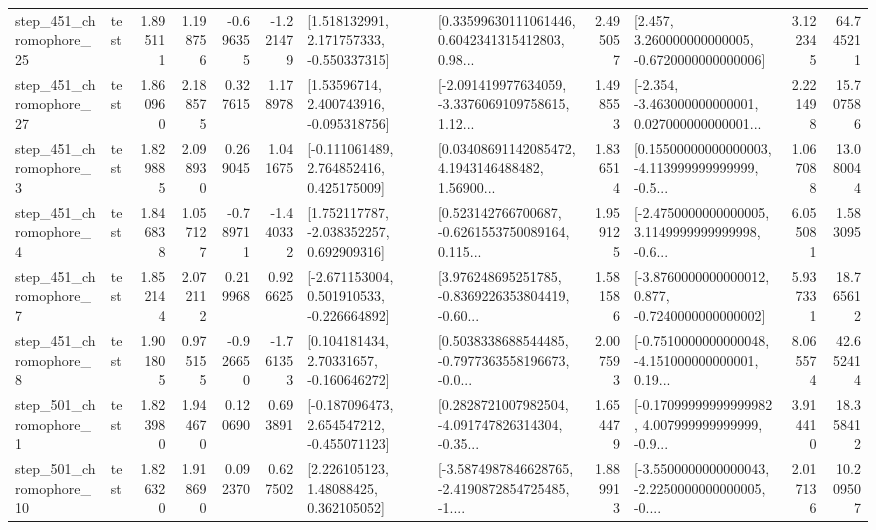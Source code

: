 \begin{tabular}{llrrrrllrlrr}
  step\_451\_chromophore\_25 &      test &      1.895111 &    1.198756 &     -0.696355 & -1.221479 &    [1.518132991, 2.171757333, -0.550337315] &  [0.33599630111061446, 0.6042341315412803, 0.98... &       2.495057 &    [2.457, 3.260000000000005, -0.6720000000000006] &            3.122345 &         64.745211 \\
  step\_451\_chromophore\_27 &      test &      1.860960 &    2.188575 &      0.327615 &  1.178978 &     [1.53596714, 2.400743916, -0.095318756] &  [-2.091419977634059, -3.3376069109758615, 1.12... &       1.498553 &  [-2.354, -3.463000000000001, 0.027000000000001... &            2.221498 &         15.707586 \\
   step\_451\_chromophore\_3 &      test &      1.829885 &    2.098930 &      0.269045 &  1.041675 &    [-0.111061489, 2.764852416, 0.425175009] &  [0.03408691142085472, 4.1943146488482, 1.56900... &       1.836514 &  [0.15500000000000003, -4.113999999999999, -0.5... &            1.067088 &         13.080044 \\
   step\_451\_chromophore\_4 &      test &      1.846838 &    1.057127 &     -0.789711 & -1.440332 &    [1.752117787, -2.038352257, 0.692909316] &  [0.523142766700687, -0.6261553750089164, 0.115... &       1.959125 &  [-2.4750000000000005, 3.1149999999999998, -0.6... &            6.055081 &          1.583095 \\
   step\_451\_chromophore\_7 &      test &      1.852144 &    2.072112 &      0.219968 &  0.926625 &   [-2.671153004, 0.501910533, -0.226664892] &  [3.976248695251785, -0.8369226353804419, -0.60... &       1.581586 &  [-3.8760000000000012, 0.877, -0.7240000000000002] &            5.937331 &         18.765612 \\
   step\_451\_chromophore\_8 &      test &      1.901805 &    0.975155 &     -0.926650 & -1.761353 &     [0.104181434, 2.70331657, -0.160646272] &  [0.5038338688544485, -0.7977363558196673, -0.0... &       2.007593 &  [-0.7510000000000048, -4.151000000000001, 0.19... &            8.065574 &         42.652414 \\
   step\_501\_chromophore\_1 &      test &      1.823980 &    1.944670 &      0.120690 &  0.693891 &   [-0.187096473, 2.654547212, -0.455071123] &  [0.2828721007982504, -4.091747826314304, -0.35... &       1.654479 &  [-0.17099999999999982, 4.007999999999999, -0.9... &            3.914410 &         18.358412 \\
  step\_501\_chromophore\_10 &      test &      1.826320 &    1.918690 &      0.092370 &  0.627502 &      [2.226105123, 1.48088425, 0.362105052] &  [-3.5874987846628765, -2.4190872854725485, -1.... &       1.889913 &  [-3.5500000000000043, -2.2250000000000005, -0.... &            2.017136 &         10.209507 \\

\end{tabular}
